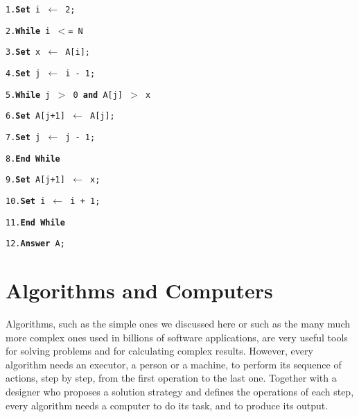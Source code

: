 {{{\begin{algorithm}[h!]
\hrulefill

\texttt{1.\quad     \textbf{Set } i \textbf{$\leftarrow$} 2;}

\texttt{2.\quad     \textbf{While } i $<$= N}

\texttt{3.\qquad\qquad           \textbf{Set  }x \textbf{$\leftarrow$} A[i];}

\texttt{4.\qquad\qquad           \textbf{Set  }j \textbf{$\leftarrow$} i - 1;}

\texttt{5.\quad\qquad           \textbf{While } j $>$ 0 \textbf{and}  A[j] $>$ x}

\texttt{6.\qquad\qquad\qquad                 \textbf{Set  }A[j+1]  $\leftarrow$ A[j];}

\texttt{7.\qquad\qquad\qquad                 \textbf{Set } j \textbf{$\leftarrow$} j - 1;}

\texttt{8.\quad\qquad           \textbf{End While}}

\texttt{9.\quad\qquad           \textbf{Set} A[j+1]  \textbf{$\leftarrow$ }x;}

\texttt{10.\qquad         \textbf{Set}  i \textbf{$\leftarrow$ }i + 1;}

\texttt{11.\quad    \textbf{End} \textbf{While}}

\texttt{12.\quad    \textbf{Answer}  A;}
\end{algorithm}

\section{\label{sec:1.7}Algorithms and Computers}

Algorithms, such as the simple ones we discussed here or such as the many much more complex ones used in billions of software applications, are very useful tools for solving problems and for calculating complex results. However, every algorithm needs an executor, a person or a machine, to perform its sequence of actions, step by step, from the first operation to the last one. Together with a designer who proposes a solution strategy and defines the operations of each step, every algorithm needs a computer to do its task, and to produce its output.

}}}
